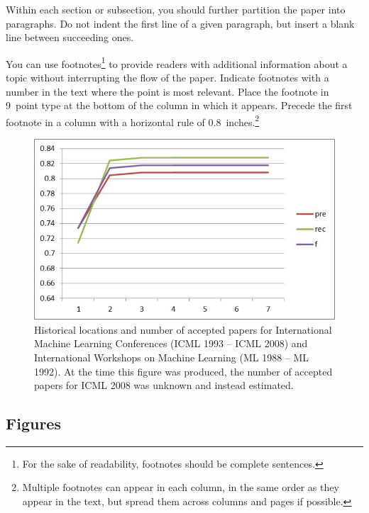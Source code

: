 \documentclass{article}
\begin{document}
Within each section or subsection, you should further partition the
paper into paragraphs. Do not indent the first line of a given
paragraph, but insert a blank line between succeeding ones.

You can use footnotes\footnote{For the sake of readability, footnotes
should be complete sentences.} to provide readers with additional
information about a topic without interrupting the flow of the paper.
Indicate footnotes with a number in the text where the point is most
relevant. Place the footnote in 9~point type at the bottom of the
column in which it appears. Precede the first footnote in a column
with a horizontal rule of 0.8~inches.\footnote{Multiple footnotes can
appear in each column, in the same order as they appear in the text,
but spread them across columns and pages if possible.}

\begin{figure}[ht]
\vskip 0.2in
\begin{center}
\centerline{\includegraphics[width=\columnwidth]{image001}}
\caption{Historical locations and number of accepted papers for International
  Machine Learning Conferences (ICML 1993 -- ICML 2008) and
  International Workshops on Machine Learning (ML 1988 -- ML
  1992). At the time this figure was produced, the number of
  accepted papers for ICML 2008 was unknown and instead estimated.}
\label{icml-historical}
\end{center}
\vskip -0.2in
\end{figure}

\subsection{Figures}
\end{document}
